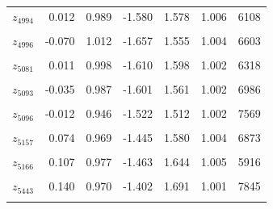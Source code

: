 \begin{longtable}{lrrrrrr}
$z_{4994}$ & 0.012 & 0.989 & -1.580 & 1.578 & 1.006 & 6108\\
\cellcolor{gray!10}{$z_{4995}$} & \cellcolor{gray!10}{-0.032} & \cellcolor{gray!10}{1.026} & \cellcolor{gray!10}{-1.666} & \cellcolor{gray!10}{1.596} & \cellcolor{gray!10}{1.002} & \cellcolor{gray!10}{5888}\\
$z_{4996}$ & -0.070 & 1.012 & -1.657 & 1.555 & 1.004 & 6603\\
\cellcolor{gray!10}{$z_{5073}$} & \cellcolor{gray!10}{-0.141} & \cellcolor{gray!10}{0.959} & \cellcolor{gray!10}{-1.664} & \cellcolor{gray!10}{1.385} & \cellcolor{gray!10}{1.002} & \cellcolor{gray!10}{5896}\\
$z_{5081}$ & 0.011 & 0.998 & -1.610 & 1.598 & 1.002 & 6318\\
\cellcolor{gray!10}{$z_{5083}$} & \cellcolor{gray!10}{0.007} & \cellcolor{gray!10}{1.025} & \cellcolor{gray!10}{-1.627} & \cellcolor{gray!10}{1.632} & \cellcolor{gray!10}{1.001} & \cellcolor{gray!10}{7343}\\
$z_{5093}$ & -0.035 & 0.987 & -1.601 & 1.561 & 1.002 & 6986\\
\cellcolor{gray!10}{$z_{5095}$} & \cellcolor{gray!10}{0.555} & \cellcolor{gray!10}{1.026} & \cellcolor{gray!10}{-1.087} & \cellcolor{gray!10}{2.188} & \cellcolor{gray!10}{1.003} & \cellcolor{gray!10}{1931}\\
$z_{5096}$ & -0.012 & 0.946 & -1.522 & 1.512 & 1.002 & 7569\\
\cellcolor{gray!10}{$z_{5116}$} & \cellcolor{gray!10}{-0.173} & \cellcolor{gray!10}{0.951} & \cellcolor{gray!10}{-1.709} & \cellcolor{gray!10}{1.344} & \cellcolor{gray!10}{1.004} & \cellcolor{gray!10}{5567}\\
$z_{5157}$ & 0.074 & 0.969 & -1.445 & 1.580 & 1.004 & 6873\\
\cellcolor{gray!10}{$z_{5161}$} & \cellcolor{gray!10}{-0.261} & \cellcolor{gray!10}{0.952} & \cellcolor{gray!10}{-1.763} & \cellcolor{gray!10}{1.251} & \cellcolor{gray!10}{1.005} & \cellcolor{gray!10}{5485}\\
$z_{5166}$ & 0.107 & 0.977 & -1.463 & 1.644 & 1.005 & 5916\\
\cellcolor{gray!10}{$z_{5407}$} & \cellcolor{gray!10}{0.297} & \cellcolor{gray!10}{1.009} & \cellcolor{gray!10}{-1.365} & \cellcolor{gray!10}{1.938} & \cellcolor{gray!10}{1.004} & \cellcolor{gray!10}{5814}\\
$z_{5443}$ & 0.140 & 0.970 & -1.402 & 1.691 & 1.001 & 7845\\
\cellcolor{gray!10}{$z_{5450}$} & \cellcolor{gray!10}{0.074} & \cellcolor{gray!10}{1.002} & \cellcolor{gray!10}{-1.502} & \cellcolor{gray!10}{1.627} & \cellcolor{gray!10}{1.005} & \cellcolor{gray!10}{6958}\\

\end{longtable}
